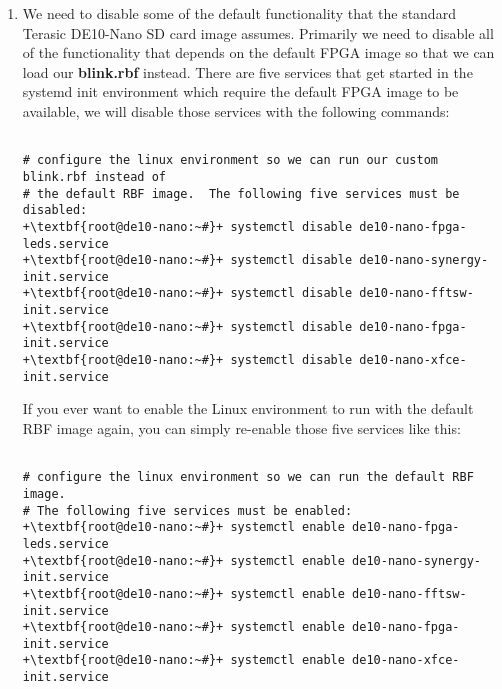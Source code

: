 \begin{flushleft}
\begin{enumerate}[
	label=\textbf{Step \arabic*.},
	leftmargin=*,
	widest={00},
	align=left]
\begin{verbatim}
The Angstrom Distribution de10-nano ttyS0

Angstrom v2016.12 - Kernel 4.1.33-ltsi-altera

de10-nano login: root
Password: +\textcolor{red}{<the password is NULL so just press ENTER>}+
root@de10-nano:~#

\end{verbatim}

\item We need to disable some of the default functionality that the standard Terasic DE10-Nano SD card image assumes.  Primarily we need to disable all of the functionality that depends on the default FPGA image so that we can load our \textbf{blink.rbf} instead.  There are five services that get started in the systemd init environment which require the default FPGA image to be available, we will disable those services with the following commands:

\begin{verbatim}

# configure the linux environment so we can run our custom blink.rbf instead of
# the default RBF image.  The following five services must be disabled:
+\textbf{root@de10-nano:~#}+ systemctl disable de10-nano-fpga-leds.service
+\textbf{root@de10-nano:~#}+ systemctl disable de10-nano-synergy-init.service
+\textbf{root@de10-nano:~#}+ systemctl disable de10-nano-fftsw-init.service
+\textbf{root@de10-nano:~#}+ systemctl disable de10-nano-fpga-init.service
+\textbf{root@de10-nano:~#}+ systemctl disable de10-nano-xfce-init.service

\end{verbatim}

If you ever want to enable the Linux environment to run with the default RBF image again, you can simply re-enable those five services like this:

\begin{verbatim}

# configure the linux environment so we can run the default RBF image.
# The following five services must be enabled:
+\textbf{root@de10-nano:~#}+ systemctl enable de10-nano-fpga-leds.service
+\textbf{root@de10-nano:~#}+ systemctl enable de10-nano-synergy-init.service
+\textbf{root@de10-nano:~#}+ systemctl enable de10-nano-fftsw-init.service
+\textbf{root@de10-nano:~#}+ systemctl enable de10-nano-fpga-init.service
+\textbf{root@de10-nano:~#}+ systemctl enable de10-nano-xfce-init.service


\end{verbatim}
\end{enumerate}
\end{flushleft}
